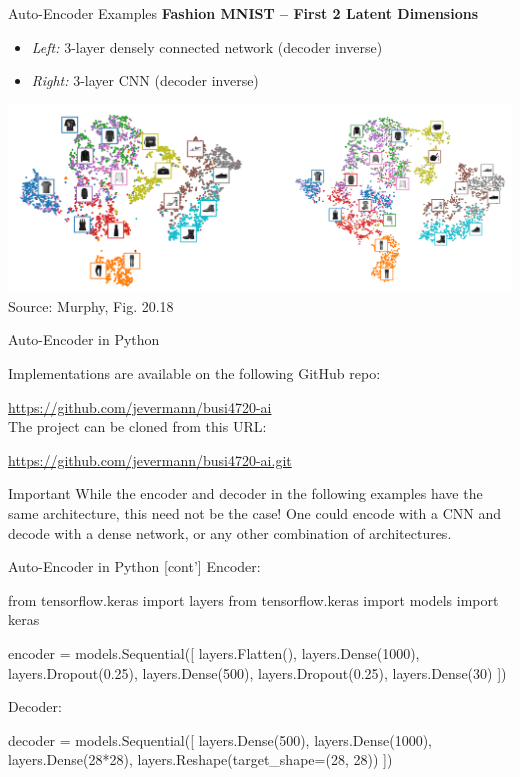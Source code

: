 \documentclass[ignorenonframetext,xcolor=x11names]{beamer}
\begin{document}
\begin{frame}{Auto-Encoder Examples}
\textbf{Fashion MNIST -- First 2 Latent Dimensions}
\begin{itemize}
   \item \emph{Left:} 3-layer densely connected network (decoder inverse)
   \item \emph{Right:} 3-layer CNN (decoder inverse)
\end{itemize} 

\begin{center}
\includegraphics[width=\textwidth]{murphy_20_18.png} \\

\scriptsize Source: Murphy, Fig. 20.18 \normalsize
\end{center}
\end{frame}

\begin{frame}{Auto-Encoder in Python}

Implementations are available on the following GitHub repo:

\url{https://github.com/jevermann/busi4720-ai} \\


The project can be cloned from this URL:

\url{https://github.com/jevermann/busi4720-ai.git}

\begin{block}{Important}
While the encoder and decoder in the following examples have the same architecture, this need not be the case! One could encode with a CNN and decode with a dense network, or any other combination of architectures.
\end{block}

\end{frame}

\begin{frame}[fragile]{Auto-Encoder in Python \small [cont']}
Encoder:
\begin{pythoncode}
from tensorflow.keras import layers
from tensorflow.keras import models
import keras

encoder = models.Sequential([
    layers.Flatten(),
    layers.Dense(1000),
    layers.Dropout(0.25),
    layers.Dense(500),
    layers.Dropout(0.25),
    layers.Dense(30)
])
\end{pythoncode}
Decoder:
\begin{pythoncode}
decoder = models.Sequential([
    layers.Dense(500),
    layers.Dense(1000),
    layers.Dense(28*28),
    layers.Reshape(target_shape=(28, 28))
])
\end{pythoncode}
\end{frame}
\end{document}
